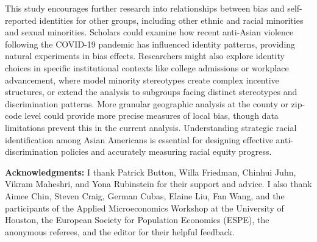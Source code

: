 \documentclass[12pt,english]{article}
\newcommand{\ACKNOWLEDGMENTS}{
 I thank Patrick Button, Willa Friedman, Chinhui Juhn, Vikram Maheshri, and Yona Rubinstein for their support and advice. I also thank Aimee Chin, Steven Craig, German Cubas, Elaine Liu, Fan Wang, and the participants of the Applied Microeconomics Workshop at the University of Houston, the European Society for Population Economics (ESPE), the anonymous referees, and the editor for their helpful feedback.}
\providecommand{\DIFaddend}{} %
\DeclareRobustCommand{\DIFaddend}{\DIFOaddend \let\includegraphics\DIFOincludegraphics} %
\begin{document}
\DIFaddend This study encourages further research into relationships between bias and self-reported identities for other groups, including other ethnic and racial minorities and sexual minorities. Scholars could examine how recent anti-Asian violence following the COVID-19 pandemic has influenced identity patterns, providing natural experiments in bias effects. Researchers might also explore identity choices in specific institutional contexts like college admissions or workplace advancement, where model minority stereotypes create complex incentive structures, or extend the analysis to subgroups facing distinct stereotypes and discrimination patterns. More granular geographic analysis at the county or zip-code level could provide more precise measures of local bias, though data limitations prevent this in the current analysis. Understanding strategic racial identification among Asian Americans is essential for designing effective anti-discrimination policies and accurately measuring racial equity progress.

\clearpage

\begingroup
{}
\setlength\bibitemsep{5pt}
\printbibliography[title=References]
\endgroup

\newpage
\pagebreak

\vspace{2em}
\noindent\textbf{Acknowledgments:} \ACKNOWLEDGMENTS

\pagebreak

\end{document}
